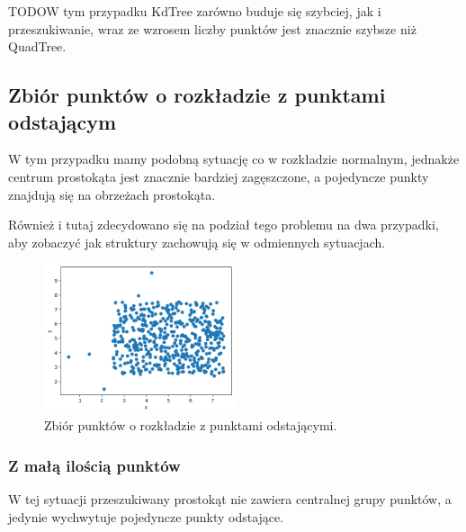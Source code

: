 \documentclass{lab}
\begin{document}
TODOW tym przypadku KdTree zarówno buduje się szybciej, jak i przeszukiwanie, wraz ze wzrosem liczby punktów jest znacznie szybsze niż QuadTree.

\newpage
\subsection{Zbiór punktów o rozkładzie z punktami odstającym}
W tym przypadku mamy podobną sytuację co w rozkładzie normalnym, jednakże centrum prostokąta jest znacznie bardziej zagęszczone, a pojedyncze punkty znajdują się na obrzeżach prostokąta.

Również i tutaj zdecydowano się na podział tego problemu na dwa przypadki, aby zobaczyć jak struktury zachowują się w odmiennych sytuacjach.

\begin{figure}[H]
  \centering
  \includegraphics[width=0.5\textwidth]{resources/outlier.png}
  \caption{Zbiór punktów o rozkładzie z punktami odstającymi.}
  \label{fig:outlier}
\end{figure}

\subsubsection{Z małą ilością punktów}
W tej sytuacji przeszukiwany prostokąt nie zawiera centralnej grupy punktów, a jedynie wychwytuje pojedyncze punkty odstające.
\end{document}
